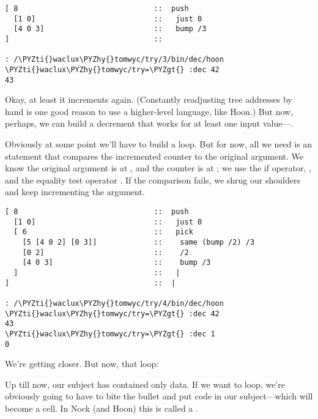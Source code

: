 \begin{framed_shaded}
\begin{Verbatim}[fontsize=\relsize{-2.5},fontseries=b,commandchars=\\\{\}]
[ 8                               ::  push
  [1 0]                           ::   just 0
  [4 0 3]                         ::   bump /3
]                                 ::

: /\PYZti{}waclux\PYZhy{}tomwyc/try/3/bin/dec/hoon
\PYZti{}waclux\PYZhy{}tomwyc/try=\PYZgt{} :dec 42
43
\end{Verbatim}
\end{framed_shaded}
Okay, at least it increments again.  (Constantly readjusting tree
addresses by hand is one good reason to use a higher-level
language, like Hoon.) But now, perhaps, we can build a decrement
that works for at least one input value---.

Obviously at some point we'll have to build a loop.  But for now,
all we need is an  statement that compares the incremented
counter to the original argument.  We know the original argument
is at , and the counter is at ; we use the if operator,
, and the equality test operator .  If the comparison
fails, we shrug our shoulders and keep incrementing the argument.

\begin{framed_shaded}
\begin{Verbatim}[fontsize=\relsize{-2.5},fontseries=b,commandchars=\\\{\}]
[ 8                               ::  push
  [1 0]                           ::   just 0
  [ 6                             ::   pick
    [5 [4 0 2] [0 3]]             ::    same (bump /2) /3
    [0 2]                         ::    /2
    [4 0 3]                       ::    bump /3
  ]                               ::   |
]                                 ::  |

: /\PYZti{}waclux\PYZhy{}tomwyc/try/4/bin/dec/hoon
\PYZti{}waclux\PYZhy{}tomwyc/try=\PYZgt{} :dec 42
43
\PYZti{}waclux\PYZhy{}tomwyc/try=\PYZgt{} :dec 1
0
\end{Verbatim}
\end{framed_shaded}
We're getting closer.  But now, that loop:

Up till now, our subject has contained only data.  If we want to
loop, we're obviously going to have to bite the bullet and put
code in our subject---which will become a  cell.
In Nock (and Hoon) this is called a .

